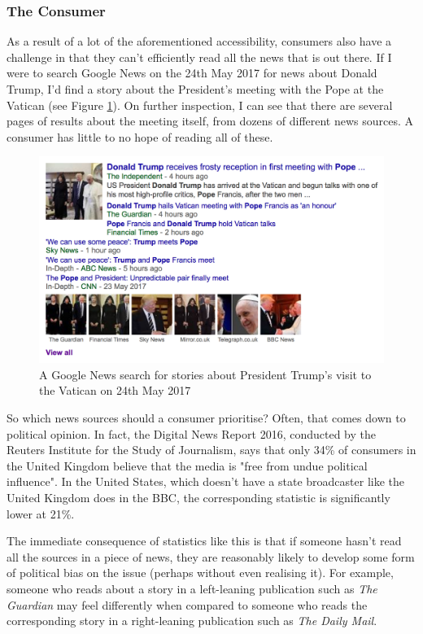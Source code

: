 \documentclass[12pt]{article}
\begin{document}
\subsubsection{The Consumer}

As a result of a lot of the aforementioned accessibility, consumers also have a challenge in that they can't efficiently read all the news that is out there. If I were to search Google News on the 24th May 2017 for news about Donald Trump, I'd find a story about the President's meeting with the Pope at the Vatican (see Figure \ref{DonaldTrumpPope}). On further inspection, I can see that there are several pages of results about the meeting itself, from dozens of different news sources. A consumer has little to no hope of reading all of these.

\begin{figure}[h]
  \centering
    \includegraphics[scale=0.6]{DonaldTrumpPope.png}
   \caption[A Google News Search on 24th May 2017]{A Google News search for stories about President Trump's visit to the Vatican on 24th May 2017}
   \label{DonaldTrumpPope}
\end{figure}

So which news sources should a consumer prioritise? Often, that comes down to political opinion. In fact, the Digital News Report 2016, conducted by the Reuters Institute for the Study of Journalism, says that only 34\% of consumers in the United Kingdom believe that the media is "free from undue political influence". In the United States, which doesn't have a state broadcaster like the United Kingdom does in the BBC, the corresponding statistic is significantly lower at 21\%.

The immediate consequence of statistics like this is that if someone hasn't read all the sources in a piece of news, they are reasonably likely to develop some form of political bias on the issue (perhaps without even realising it). For example, someone who reads about a story in a left-leaning publication such as \emph{The Guardian} may feel differently when compared to someone who reads the corresponding story in a right-leaning publication such as \emph{The Daily Mail}. 
\end{document}
